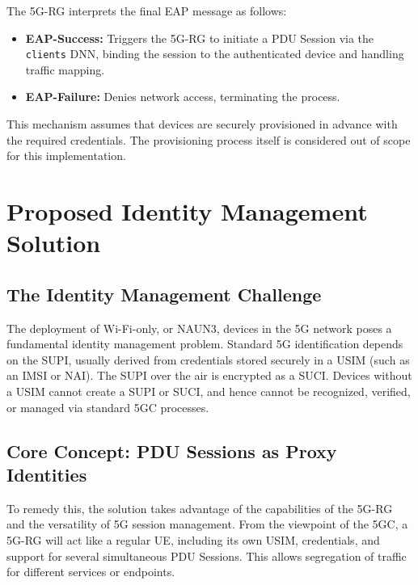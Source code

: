 The \ac{5G-RG} interprets the final \ac{EAP} message as follows:

\begin{itemize}
    \item \textbf{\ac{EAP}-Success:} Triggers the \ac{5G-RG} to initiate a \ac{PDU} Session via the \texttt{clients} \ac{DNN}, binding the session to the authenticated device and handling traffic mapping.
    \item \textbf{\ac{EAP}-Failure:} Denies network access, terminating the process.
\end{itemize}

This mechanism assumes that devices are securely provisioned in advance with the required credentials. The provisioning process itself is considered out of scope for this implementation.

\section{Proposed Identity Management Solution}


\subsection{The Identity Management Challenge}

The deployment of Wi-Fi-only, or \ac{NAUN3}, devices in the \ac{5G} network poses a fundamental identity management problem. Standard \ac{5G} identification depends on the \ac{SUPI}, usually derived from credentials stored securely in a \ac{USIM} (such as an \ac{IMSI} or \ac{NAI}). The \ac{SUPI} over the air is encrypted as a \ac{SUCI}. Devices without a \ac{USIM} cannot create a \ac{SUPI} or \ac{SUCI}, and hence cannot be recognized, verified, or managed via standard \ac{5GC} processes.

\subsection{Core Concept: \acs{PDU} Sessions as Proxy Identities}

To remedy this, the solution takes advantage of the capabilities of the \ac{5G-RG} and the versatility of \ac{5G} session management. From the viewpoint of the \ac{5GC}, a \ac{5G-RG} will act like a regular \ac{UE}, including its own \ac{USIM}, credentials, and support for several simultaneous \ac{PDU} Sessions. This allows segregation of traffic for different services or endpoints.

